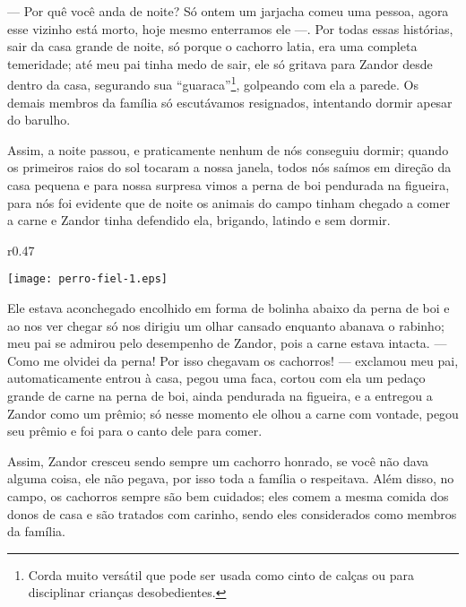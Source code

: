 --- Por quê você anda de noite? Só ontem um jarjacha comeu uma pessoa, agora esse vizinho está morto, hoje mesmo enterramos ele ---.
Por todas essas histórias, sair da casa grande de noite, só porque o cachorro latia, era uma completa temeridade; até meu pai tinha medo de sair, ele só gritava para Zandor desde dentro da casa, segurando sua ``guaraca''\footnote{Corda muito versátil que pode ser usada como cinto de calças ou para disciplinar crianças desobedientes.}, golpeando com ela a parede. 
Os demais membros da família só escutávamos resignados, intentando dormir apesar do barulho.

Assim, a noite passou, e praticamente nenhum de nós conseguiu dormir; quando os primeiros raios do sol tocaram a nossa janela, todos nós saímos em direção da casa pequena e para nossa surpresa vimos a perna de boi pendurada na figueira, para nós foi evidente que de noite os animais do campo tinham chegado a comer a carne e Zandor tinha defendido ela, brigando, latindo e sem dormir.
\ifdefined\EnableIncludeImages 
\begin{wrapfigure}{r}{0.47\textwidth}
  \begin{center}
  \vspace{-0.5cm}
    \texttt{[image: perro-fiel-1.eps]}
  \end{center}
  \vspace{-0.5cm}
\end{wrapfigure}
\fi
Ele estava aconchegado encolhido em forma de bolinha abaixo da perna de boi e ao nos ver chegar só nos dirigiu um olhar cansado enquanto abanava o rabinho; meu pai se admirou pelo desempenho de Zandor, pois a carne estava intacta. 
--- Como me olvidei da perna! Por isso chegavam os cachorros! --- exclamou meu pai, 
automaticamente entrou à casa, pegou uma faca, cortou com ela um pedaço grande de carne na perna de boi, ainda pendurada na figueira, e a entregou a Zandor como um prêmio; só nesse momento ele olhou a carne com vontade, pegou seu prêmio e foi para o canto dele para comer.

Assim, Zandor cresceu sendo sempre um cachorro honrado, se você não dava alguma coisa, ele não pegava, por isso toda a família o respeitava. Além disso, no campo, os cachorros sempre são bem cuidados; eles comem a mesma comida dos donos de casa e são tratados com carinho, sendo eles considerados como membros da família.

